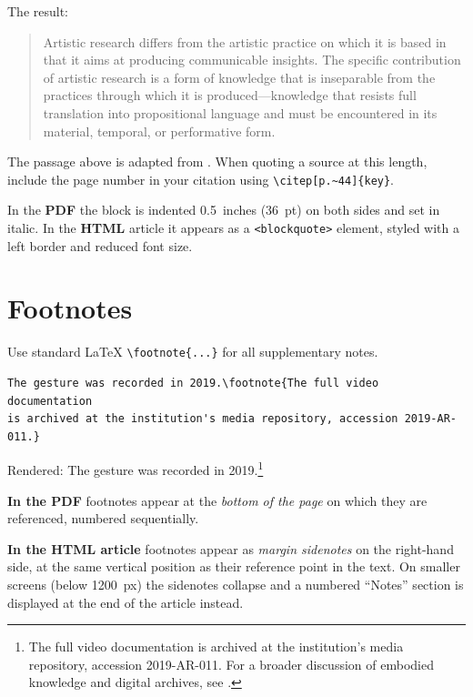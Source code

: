 The result:

\begin{quote}
Artistic research differs from the artistic practice on which it is
based in that it aims at producing communicable insights. The specific
contribution of artistic research is a form of knowledge that is
inseparable from the practices through which it is produced—knowledge
that resists full translation into propositional language and must
be encountered in its material, temporal, or performative form.
\end{quote}

The passage above is adapted from \citet[p.~44]{borgdorff2012conflict}.
When quoting a source at this length, include the page number in your
citation using \verb|\citep[p.~44]{key}|.

In the \textbf{PDF} the block is indented 0.5~inches (36~pt) on both
sides and set in italic. In the \textbf{HTML} article it appears as a
\texttt{<blockquote>} element, styled with a left border and reduced
font size.

\section{Footnotes}

Use standard LaTeX \verb|\footnote{...}| for all supplementary notes.

\begin{verbatim}
The gesture was recorded in 2019.\footnote{The full video documentation
is archived at the institution's media repository, accession 2019-AR-011.}
\end{verbatim}

Rendered: The gesture was recorded in 2019.\footnote{The full video
documentation is archived at the institution's media repository, accession
2019-AR-011. For a broader discussion of embodied knowledge and digital
archives, see \citet{andersen2022embodied}.}

\textbf{In the PDF} footnotes appear at the \emph{bottom of the page} on
which they are referenced, numbered sequentially.

\textbf{In the HTML article} footnotes appear as \emph{margin sidenotes}
on the right-hand side, at the same vertical position as their reference
point in the text. On smaller screens (below 1200~px) the sidenotes
collapse and a numbered \enquote{Notes} section is displayed at the end
of the article instead.

